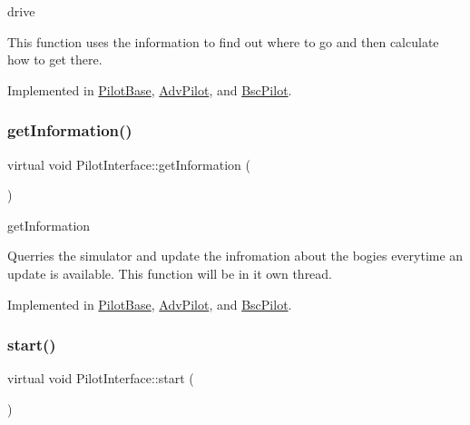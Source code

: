 drive 

This function uses the information to find out where to go and then calculate how to get there. 

Implemented in \hyperlink{classPilotBase_ad4a3db2cf9d40b5936dba864977eee95}{Pilot\+Base}, \hyperlink{classAdvPilot_a06a08829ecef443f01860f48fc462c22}{Adv\+Pilot}, and \hyperlink{classBscPilot_af73cc7f821a08574eae05be8c5806646}{Bsc\+Pilot}.

\mbox{\label{classPilotInterface_a8f328815397986cc26fc8baa2bb538e2}} 
\subsubsection{\texorpdfstring{get\+Information()}{getInformation()}}
{\footnotesize\ttfamily virtual void Pilot\+Interface\+::get\+Information (\begin{DoxyParamCaption}{ }\end{DoxyParamCaption})\hspace{0.3cm}{\ttfamily [pure virtual]}}



get\+Information 

Querries the simulator and update the infromation about the bogies everytime an update is available. This function will be in it own thread. 

Implemented in \hyperlink{classPilotBase_a0c3cfd1b468842734e3706ff8dea133b}{Pilot\+Base}, \hyperlink{classAdvPilot_a1a7f8ca0d8c97120fa2c93f7e512c944}{Adv\+Pilot}, and \hyperlink{classBscPilot_aa40dc622dc2c856c0a8b2e8c61970f00}{Bsc\+Pilot}.

\mbox{\label{classPilotInterface_a86f3a427525364eb977fbe0a032fb9f7}} 
\subsubsection{\texorpdfstring{start()}{start()}}
{\footnotesize\ttfamily virtual void Pilot\+Interface\+::start (\begin{DoxyParamCaption}{ }\end{DoxyParamCaption})\hspace{0.3cm}{\ttfamily [pure virtual]}}



